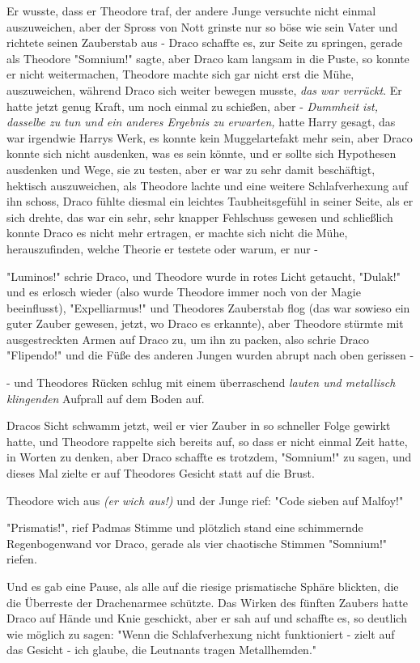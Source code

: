 {Er wusste, dass er Theodore traf, der andere Junge versuchte nicht einmal auszuweichen, aber der Spross von Nott grinste nur so böse wie sein Vater und richtete seinen Zauberstab aus - Draco schaffte es, zur Seite zu springen, gerade als Theodore "Somnium!" sagte, aber Draco kam langsam in die Puste, so konnte er nicht weitermachen, Theodore machte sich gar nicht erst die Mühe, auszuweichen, während Draco sich weiter bewegen musste, \emph{das war verrückt}. Er hatte jetzt genug Kraft, um noch einmal zu schießen, aber - \emph{Dummheit ist, dasselbe zu tun und ein anderes Ergebnis zu erwarten,} hatte Harry gesagt, das war irgendwie Harrys Werk, es konnte kein Muggelartefakt mehr sein, aber Draco konnte sich nicht ausdenken, was es sein könnte, und er sollte sich Hypothesen ausdenken und Wege, sie zu testen, aber er war zu sehr damit beschäftigt, hektisch auszuweichen, als Theodore lachte und eine weitere Schlafverhexung auf ihn schoss, Draco fühlte diesmal ein leichtes Taubheitsgefühl in seiner Seite, als er sich drehte, das war ein sehr, sehr knapper Fehlschuss gewesen und schließlich konnte Draco es nicht mehr ertragen, er machte sich nicht die Mühe, herauszufinden, welche Theorie er testete oder warum, er nur -

"Luminos!" schrie Draco, und Theodore wurde in rotes Licht getaucht, "Dulak!" und es erlosch wieder (also wurde Theodore immer noch von der Magie beeinflusst), "Expelliarmus!" und Theodores Zauberstab flog (das war sowieso ein guter Zauber gewesen, jetzt, wo Draco es erkannte), aber Theodore stürmte mit ausgestreckten Armen auf Draco zu, um ihn zu packen, also schrie Draco "Flipendo!" und die Füße des anderen Jungen wurden abrupt nach oben gerissen -

- und Theodores Rücken schlug mit einem überraschend \emph{lauten und metallisch klingenden} Aufprall auf dem Boden auf.

Dracos Sicht schwamm jetzt, weil er vier Zauber in so schneller Folge gewirkt hatte, und Theodore rappelte sich bereits auf, so dass er nicht einmal Zeit hatte, in Worten zu denken, aber Draco schaffte es trotzdem, "Somnium!" zu sagen, und dieses Mal zielte er auf Theodores Gesicht statt auf die Brust.

Theodore wich aus \emph{(er wich aus!)} und der Junge rief: "Code sieben auf Malfoy!"

"Prismatis!", rief Padmas Stimme und plötzlich stand eine schimmernde Regenbogenwand vor Draco, gerade als vier chaotische Stimmen "Somnium!" riefen.

Und es gab eine Pause, als alle auf die riesige prismatische Sphäre blickten, die die Überreste der Drachenarmee schützte. Das Wirken des fünften Zaubers hatte Draco auf Hände und Knie geschickt, aber er sah auf und schaffte es, so deutlich wie möglich zu sagen: "Wenn die Schlafverhexung nicht funktioniert - zielt auf das Gesicht - ich glaube, die Leutnants tragen Metallhemden."

}
